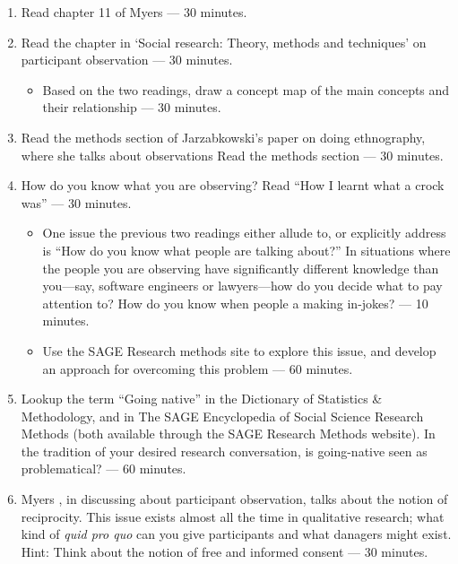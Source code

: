 \documentclass[]{book}
\providecommand{\tightlist}{%
  \setlength{\itemsep}{0pt}\setlength{\parskip}{0pt}}
\theoremstyle{definition}
\theoremstyle{definition}
\theoremstyle{definition}
\theoremstyle{remark}
\begin{document}
\begin{enumerate}
\def\labelenumi{\arabic{enumi}.}
\item
  Read chapter 11 of Myers \autocite*[
  p.~136--150]{myers_2013_qualitativeresearchbusiness} --- 30 minutes.
\item
  Read the chapter in `Social research: Theory, methods and techniques'
  on participant observation
  \autocite{corbetta_2003_socialresearchtheory} --- 30 minutes.

  \begin{itemize}
  \tightlist
  \item
    Based on the two readings, draw a concept map of the main concepts
    and their relationship --- 30 minutes.
  \end{itemize}
\item
  Read the methods section of Jarzabkowski's paper on doing ethnography,
  where she talks about observations
  \autocite{jarzabkowski_2015_conductingglobalteambased} Read the
  methods section --- 30 minutes.
\item
  How do you know what you are observing? Read ``How I learnt what a
  crock was'' \autocite{becker_1993_howlearnedwhat} --- 30 minutes.

  \begin{itemize}
  \item
    One issue the previous two readings either allude to, or explicitly
    address is ``How do you know what people are talking about?'' In
    situations where the people you are observing have significantly
    different knowledge than you---say, software engineers or
    lawyers---how do you decide what to pay attention to? How do you
    know when people a making in-jokes? --- 10 minutes.
  \item
    Use the SAGE Research methods site to explore this issue, and
    develop an approach for overcoming this problem --- 60 minutes.
  \end{itemize}
\item
  Lookup the term ``Going native'' in the Dictionary of Statistics \&
  Methodology, and in The SAGE Encyclopedia of Social Science Research
  Methods (both available through the SAGE Research Methods website). In
  the tradition of your desired research conversation, is going-native
  seen as problematical? --- 60 minutes.
\item
  Myers \autocite*{myers_2013_qualitativeresearchbusiness}, in
  discussing about participant observation, talks about the notion of
  reciprocity. This issue exists almost all the time in qualitative
  research; what kind of \emph{quid pro quo} can you give participants
  and what danagers might exist. Hint: Think about the notion of free
  and informed consent
  \autocite{theuniversityofauckland_2013_guidingprinciplesconducting}
  --- 30 minutes.
\end{enumerate}
\end{document}
